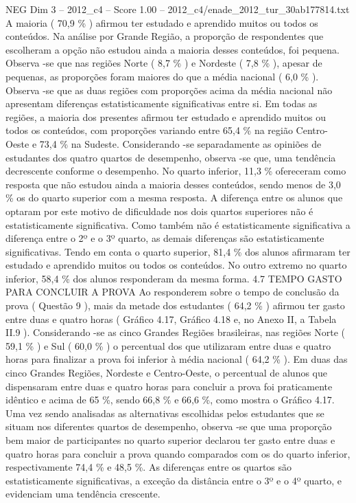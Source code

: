 \begin{textsample}{NEG Dim 3 – 2012\_c4 – Score 1.00 – 2012\_c4/enade\_2012\_tur\_30ab177814.txt}
A maioria ( 70,9 \% ) afirmou ter estudado e aprendido muitos ou todos os conteúdos.
Na análise por Grande Região, a proporção de respondentes que escolheram a opção não estudou ainda a maioria desses conteúdos, foi pequena.
Observa -se que nas regiões Norte ( 8,7 \% ) e Nordeste ( 7,8 \% ), apesar de pequenas, as proporções foram maiores do que a média nacional ( 6,0 \% ).
Observa -se que as duas regiões com proporções acima da média nacional não apresentam diferenças estatisticamente significativas entre si.
Em todas as regiões, a maioria dos presentes afirmou ter estudado e aprendido muitos ou todos os conteúdos, com proporções variando entre 65,4 \% na região Centro-Oeste e 73,4 \% na Sudeste.
Considerando -se separadamente as opiniões de estudantes dos quatro quartos de desempenho, observa -se que, uma tendência decrescente conforme o desempenho.
No quarto inferior, 11,3 \% ofereceram como resposta que não estudou ainda a maioria desses conteúdos, sendo menos de 3,0 \% os do quarto superior com a mesma resposta.
A diferença entre os alunos que optaram por este motivo de dificuldade nos dois quartos superiores não é estatisticamente significativa.
Como também não é estatisticamente significativa a diferença entre o 2º e o 3º quarto, as demais diferenças são estatisticamente significativas.
Tendo em conta o quarto superior, 81,4 \% dos alunos afirmaram ter estudado e aprendido muitos ou todos os conteúdos.
No outro extremo no quarto inferior, 58,4 \% dos alunos responderam da mesma forma. 4.7 TEMPO GASTO PARA CONCLUIR A PROVA Ao responderem sobre o tempo de conclusão da prova ( Questão 9 ), mais da metade dos estudantes ( 64,2 \% ) afirmou ter gasto entre duas e quatro horas ( Gráfico 4.17, Gráfico 4.18 e, no Anexo II, a Tabela II.9 ).
Considerando -se as cinco Grandes Regiões brasileiras, nas regiões Norte ( 59,1 \% ) e Sul ( 60,0 \% ) o percentual dos que utilizaram entre duas e quatro horas para finalizar a prova foi inferior à média nacional ( 64,2 \% ).
Em duas das cinco Grandes Regiões, Nordeste e Centro-Oeste, o percentual de alunos que dispensaram entre duas e quatro horas para concluir a prova foi praticamente idêntico e acima de 65 \%, sendo 66,8 \% e 66,6 \%, como mostra o Gráfico 4.17.
Uma vez sendo analisadas as alternativas escolhidas pelos estudantes que se situam nos diferentes quartos de desempenho, observa -se que uma proporção bem maior de participantes no quarto superior declarou ter gasto entre duas e quatro horas para concluir a prova quando comparados com os do quarto inferior, respectivamente 74,4 \% e 48,5 \%.
As diferenças entre os quartos são estatisticamente significativas, a exceção da distância entre o 3º e o 4º quarto, e evidenciam uma tendência crescente.

\end{textsample}
